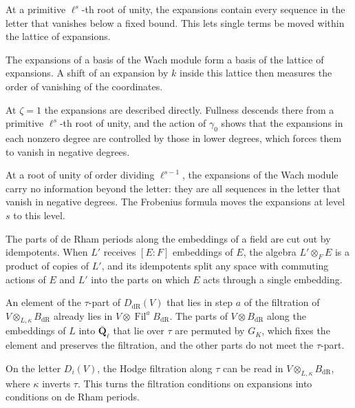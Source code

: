 At a primitive $\ell^s$-th root of unity, the expansions contain every sequence
in the letter that vanishes below a fixed bound. This lets single terms be
moved within the lattice of expansions.

The expansions of a basis of the Wach module form a basis of the lattice of
expansions. A shift of an expansion by $k$ inside this lattice then measures
the order of vanishing of the coordinates.

At $\zeta=1$ the expansions are described directly. Fullness descends there
from a primitive $\ell^s$-th root of unity, and the action of $\gamma_0$ shows
that the expansions in each nonzero degree are controlled by those in lower
degrees, which forces them to vanish in negative degrees.

At a root of unity of order dividing $\ell^{s-1}$, the expansions of the Wach
module carry no information beyond the letter: they are all sequences in the
letter that vanish in negative degrees. The Frobenius formula moves the
expansions at level $s$ to this level.

The parts of de Rham periods along the embeddings of a field are cut out by
idempotents. When $L'$ receives $[E:F]$ embeddings of $E$, the algebra
$L'\otimes_FE$ is a product of copies of $L'$, and its idempotents split any
space with commuting actions of $E$ and $L'$ into the parts on which $E$ acts
through a single embedding.

An element of the $\tau$-part of $D_{\mathrm{dR}}(V)$ that lies in step $a$ of
the filtration of $V\otimes_{L,\kappa}B_{\mathrm{dR}}$ already lies in
$V\otimes\operatorname{Fil}^aB_{\mathrm{dR}}$. The parts of
$V\otimes B_{\mathrm{dR}}$ along the embeddings of $L$ into $\bar{\mathbf
Q}_\ell$ that lie over $\tau$ are permuted by $G_K$, which fixes the element and
preserves the filtration, and the other parts do not meet the $\tau$-part.

On the letter $D_i(V)$, the Hodge filtration along $\tau$ can be read in
$V\otimes_{L,\kappa}B_{\mathrm{dR}}$, where $\kappa$ inverts $\tau$. This
turns the filtration conditions on expansions into conditions on de Rham
periods.

